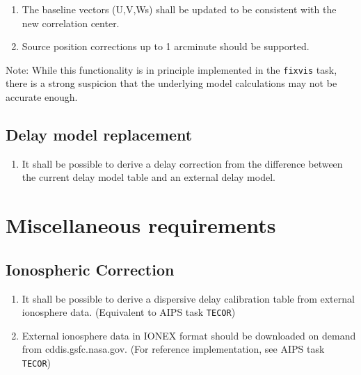 \documentclass[11pt,a4paper]{article}
\begin{document}
\begin{enumerate}[subseclist]
\begin{enumerate}[subsecsublist]
  \item The baseline vectors (U,V,Ws) shall be updated to be consistent with the new correlation
    center.

  \item Source position corrections up to 1 arcminute should be supported.

  \end{enumerate}

  Note: While this functionality is in principle implemented in the
  \texttt{fixvis} task, there is a strong suspicion that the
  underlying model calculations may not be accurate enough.
  
\end{enumerate}


\subsection{Delay model replacement}

\begin{enumerate}[subseclist]

\item It shall be possible to derive a delay correction from the
  difference between the current delay model table and an external
  delay model.

\end{enumerate}


\section{Miscellaneous requirements}

\subsection{Ionospheric Correction}

\begin{enumerate}[subseclist]

\item It shall be possible to derive a dispersive delay calibration
  table from external ionosphere data. (Equivalent to AIPS task
  \texttt{TECOR})

\item External ionosphere data in IONEX format should be downloaded on
  demand from cddis.gsfc.nasa.gov. (For reference implementation, see
  AIPS task \texttt{TECOR})

\end{enumerate}
\end{document}
